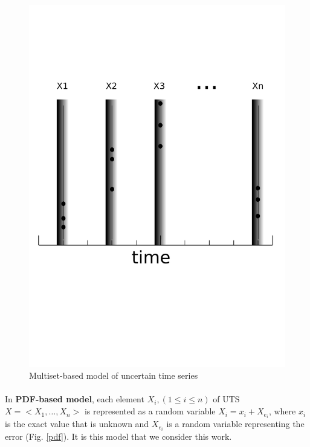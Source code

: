  \begin{figure}
  \centering
   \includegraphics[scale=0.4]{images/multiset2}
    \caption{Multiset-based model of uncertain time series}
  \label{multiset}
  \end{figure}

\paragraph{} In \textbf{PDF-based model}, each element $X_i, (1\leq i \leq n)$ of UTS $X = <X_1, \ldots, X_n>$ is   represented as a random variable $X_i=x_i + X_{e_i}$, where $x_i$ is the exact value that is   unknown and $X_{e_i}$ is a random variable representing the error (Fig. \ref{pdf}). It is this model that we  consider this work.
  
